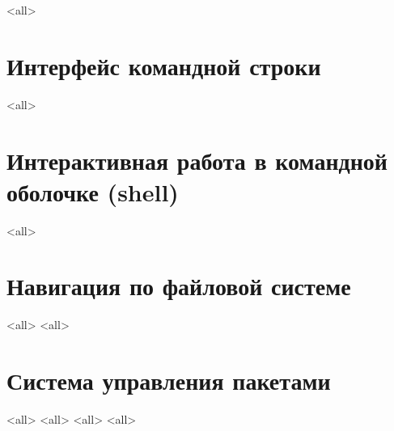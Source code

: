 \mode<all>{}


\section{Интерфейс командной строки}
\mode<all>{}

\section{Интерактивная работа в командной оболочке (shell) }
\mode<all>{}

\section{Навигация по файловой системе}
\mode<all>{}
\mode<all>{}

\section{Система управления пакетами}
\mode<all>{}
\mode<all>{}
\mode<all>{}
\mode<all>{}


